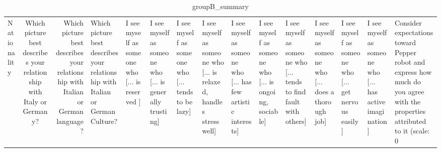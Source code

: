 \begin{table}
\caption{groupB_summary}
\label{tab:groupB_summary}
\begin{tabular}{lcr}
\toprule
Nationality & Which picture best describes your relationship with Italy or Germany? & Which picture best describes your relationship with Italian or German language? & Which picture best describes your relationship with Italian or German Culture? & I see myself as someone who  [... is reserved ] & I see myself as someone who  [... is generally trusting] & I see myself as someone who  [... tends to be lazy] & I see myself as someone who  [... is relaxed, handles stress well] & I see myself as someone who  [... has few artistic interests] & I see myself as someone who  [... is ongoing, sociable] & I see myself as someone who  [... tends to find fault with others] & I see myself as someone who  [... does a thorough job] & I see myself as someone who  [... get nervous easily] & I see myself as someone who  [... has active imagination] & Consider expectations toward Pepper robot and express how much do you agree with the properties attributed to it (scale: 0%
\end{tabular}
\end{table}

